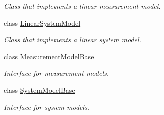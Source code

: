 \begin{DoxyCompactItemize}
\begin{DoxyCompactList}\small\item\em Class that implements a linear measurement model. \end{DoxyCompactList}\item 
class \hyperlink{classrefill_1_1LinearSystemModel}{Linear\+System\+Model}
\begin{DoxyCompactList}\small\item\em Class that implements a linear system model. \end{DoxyCompactList}\item 
class \hyperlink{classrefill_1_1MeasurementModelBase}{Measurement\+Model\+Base}
\begin{DoxyCompactList}\small\item\em Interface for measurement models. \end{DoxyCompactList}\item 
class \hyperlink{classrefill_1_1SystemModelBase}{System\+Model\+Base}
\begin{DoxyCompactList}\small\item\em Interface for system models. \end{DoxyCompactList}\end{DoxyCompactItemize}

